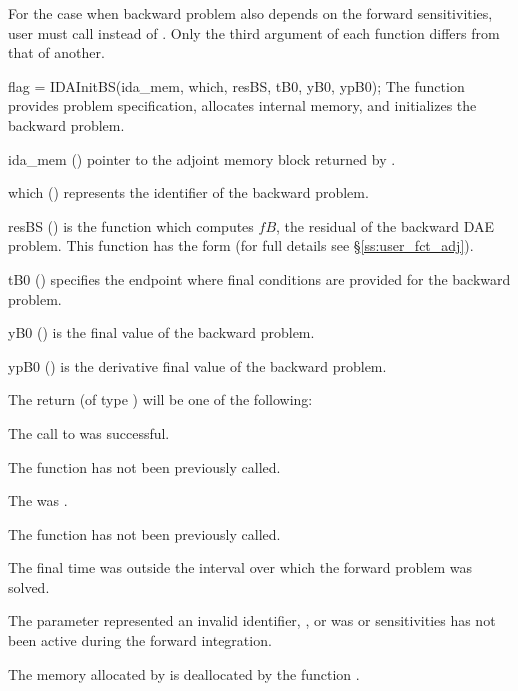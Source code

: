 For the case when backward problem also depends on the forward sensitivities, user
must call  instead of . Only the third argument of each function
differs from that of another.

{
  flag = IDAInitBS(ida\_mem, which, resBS, tB0, yB0, ypB0);
}
{
  The function  provides problem specification, allocates internal memory, 
  and initializes the backward problem.
}
{
  \begin{args}
  \item[ida\_mem] ()
    pointer to the adjoint memory block returned by .
  \item[which] ()
    represents the identifier of the backward problem.
  \item[resBS] ()
    is the {\C} function which computes $fB$, the residual of the 
    backward DAE problem. This function has the form 
    (for full details see \S\ref{ss:user_fct_adj}).
  \item[tB0] ()
    specifies the endpoint where final conditions are provided for the 
    backward problem.
  \item[yB0] ()
    is the final value of the backward problem. 
  \item[ypB0] ()
    is the derivative final value of the backward problem. 
  \end{args}
}
{
  The return  (of type ) will be one of the following:
  \begin{args}
  \item[\Id{IDA\_SUCCESS}]
    The call to  was successful.
  \item[\Id{IDA\_NO\_MALLOC}]
    The function  has not been previously called.
  \item[\Id{IDA\_MEM\_NULL}]
    The  was .
  \item[\Id{IDA\_NO\_ADJ}]
    The function  has not been previously called.
  \item[\Id{IDA\_BAD\_TB0}]
    The final time  was outside the interval over which the forward problem
    was solved.
  \item[\Id{IDA\_ILL\_INPUT}]
    The parameter  represented an invalid identifier, ,  or 
     was  or sensitivities has not been active during the forward
    integration.
  \end{args}
}
{
  The memory allocated by  is deallocated by the function 
  .
  
}


